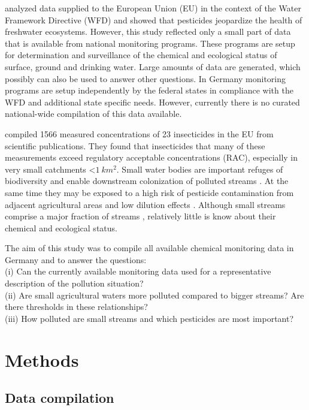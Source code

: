 \documentclass[journal=esthag,manuscript=article]{achemso}
\begin{document}
\citet{malaj_organic_2014} analyzed data supplied to the European Union (EU) in the context of the Water Framework Directive (WFD) and showed that pesticides jeopardize the health of freshwater ecosystems.
However, this study reflected only a small part of data that is available from national monitoring programs.
These programs are setup for determination and surveillance of the chemical and ecological status of surface, ground and drinking water.
Large amounts of data are generated, which possibly can also be used to answer other questions.
In Germany monitoring programs are setup independently by the federal states in compliance with the WFD \citep{quevauviller_water_2008} and additional state specific needs.
However, currently there is no curated national-wide compilation of this data available.

\citet{stehle_pesticide_2015} compiled 1566 measured concentrations of 23 insecticides in the EU from scientific publications. 
They found that insecticides that many of these measurements exceed regulatory acceptable concentrations (RAC), especially in very small catchments \textless $1~km^2$.
Small water bodies are important refuges of biodiversity \citep{davies_comparison_2008} and enable downstream colonization of polluted streams \citep{liess_analyzing_2005}.
At the same time they may be exposed to a high risk of pesticide contamination from adjacent agricultural areas and low dilution effects \citep{liess_determination_1999}.
Although small streams comprise a major fraction of streams \citep{nadeau_hydrological_2007}, relatively little is know about their chemical and ecological status.

The aim of this study was to compile all available chemical monitoring data in Germany and to answer the questions: \\
(i) Can the currently available monitoring data used for a representative description of the pollution situation? \\
(ii) Are small agricultural waters more polluted compared to bigger streams? Are there thresholds in these relationships? \\
(iii) How polluted are small streams and which pesticides are most important?


\section{Methods}
\subsection{Data compilation}
\end{document}
